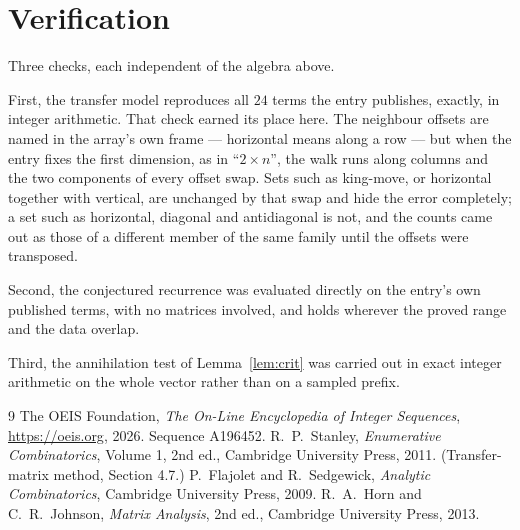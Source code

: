\documentclass[11pt,a4paper]{article}
\theoremstyle{plain}
\theoremstyle{definition}
\begin{document}
\section{Verification}

Three checks, each independent of the algebra above.

First, the transfer model reproduces all $24$ terms the entry publishes, exactly, in
integer arithmetic. That check earned its place here. The neighbour offsets are named in the
array's own frame --- horizontal means along a row --- but when the entry fixes the first
dimension, as in ``$2\times n$'', the walk runs along columns and the two components of every
offset swap. Sets such as king-move, or horizontal together with vertical, are unchanged by
that swap and hide the error completely; a set such as horizontal, diagonal and antidiagonal
is not, and the counts came out as those of a different member of the same family until the
offsets were transposed.

Second, the conjectured recurrence was evaluated directly on the entry's own published terms,
with no matrices involved, and holds wherever the proved range and the data overlap.

Third, the annihilation test of Lemma~\ref{lem:crit} was carried out in exact integer
arithmetic on the whole vector rather than on a sampled prefix.

\begin{thebibliography}{9}
 The OEIS Foundation, \emph{The On-Line Encyclopedia of Integer
Sequences}, \url{https://oeis.org}, 2026. Sequence A196452.
 R.~P.~Stanley, \emph{Enumerative Combinatorics}, Volume 1, 2nd ed.,
Cambridge University Press, 2011. (Transfer-matrix method, Section 4.7.)
 P.~Flajolet and R.~Sedgewick, \emph{Analytic Combinatorics}, Cambridge
University Press, 2009.
 R.~A.~Horn and C.~R.~Johnson, \emph{Matrix Analysis}, 2nd ed., Cambridge
University Press, 2013.
\end{thebibliography}
\end{document}

